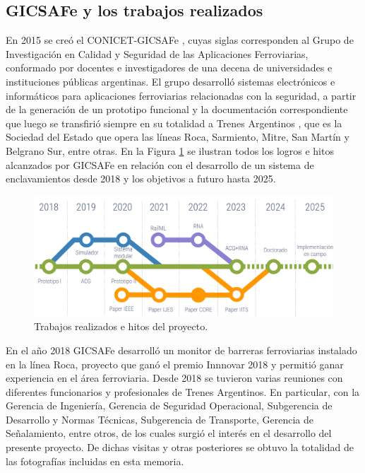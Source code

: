 \subsection{GICSAFe y los trabajos realizados}

    En 2015 se creó el CONICET-GICSAFe \cite{GICSAFE}, cuyas siglas corresponden al Grupo de Investigación en Calidad y Seguridad de las Aplicaciones Ferroviarias, conformado por docentes e investigadores de una decena de universidades e instituciones públicas argentinas. El grupo desarrolló sistemas electrónicos e informáticos para aplicaciones ferroviarias relacionadas con la seguridad, a partir de la generación de un prototipo funcional y la documentación correspondiente que luego se transfirió siempre en su totalidad a Trenes Argentinos \cite{TRENES}, que es la Sociedad del Estado que opera las líneas Roca, Sarmiento, Mitre, San Martín y Belgrano Sur, entre otras. En la Figura \ref{fig:contexto} se ilustran todos los logros e hitos alcanzados por GICSAFe en relación con el desarrollo de un sistema de enclavamientos desde 2018 y los objetivos a futuro hasta 2025.

    \begin{figure}[h]
        \centering
        \includegraphics[width=1\textwidth]{Figuras/HojaDeRuta}
        \centering\caption{Trabajos realizados e hitos del proyecto.}
        \label{fig:contexto}
    \end{figure}

    En el año 2018 GICSAFe desarrolló un monitor de barreras ferroviarias instalado en la línea Roca, proyecto que ganó el premio Innnovar 2018 \cite{INNOVAR_1,INNOVAR_2} y permitió ganar experiencia en el área ferroviaria. Desde 2018 se tuvieron varias reuniones con diferentes funcionarios y profesionales de Trenes Argentinos. En particular, con la Gerencia de Ingeniería, Gerencia de Seguridad Operacional, Subgerencia de Desarrollo y Normas Técnicas, Subgerencia de Transporte, Gerencia de Señalamiento, entre otros, de los cuales surgió el interés en el desarrollo del presente proyecto. De dichas visitas y otras posteriores se obtuvo la totalidad de las fotografías incluidas en esta memoria. 

